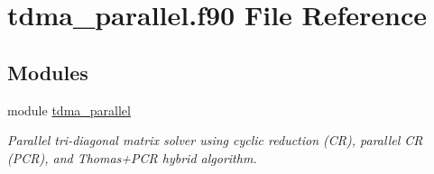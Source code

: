 \hypertarget{tdma__parallel_8f90}{}\section{tdma\+\_\+parallel.\+f90 File Reference}
\label{tdma__parallel_8f90}
\subsection*{Modules}
\begin{DoxyCompactItemize}
\item 
module \mbox{\hyperlink{namespacetdma__parallel}{tdma\+\_\+parallel}}
\begin{DoxyCompactList}\small\item\em Parallel tri-\/diagonal matrix solver using cyclic reduction (CR), parallel CR (P\+CR), and Thomas+\+P\+CR hybrid algorithm. \end{DoxyCompactList}\end{DoxyCompactItemize}
